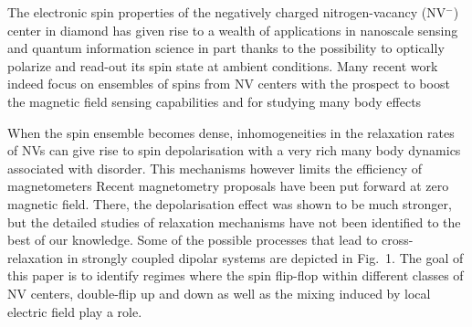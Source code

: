 \documentclass[preprintnumbers,amsmath,amssymb,superscriptaddress,twocolumn,showpacs]{revtex4-2}
\begin{document}
%

The electronic spin properties of the negatively charged nitrogen-vacancy (NV$^-$) center in diamond has given rise to a wealth of applications in nanoscale sensing and quantum information science in part thanks to the possibility to optically polarize and read-out its spin state at ambient conditions. Many recent work indeed focus on ensembles of spins from NV centers with the prospect to boost the magnetic field sensing capabilities and for studying many body effects
\citep{TALLAIRE2020421,edmonds2021characterisation, chatzidrosos2021fiberized, kucsko2018critical, giri_coupled_2018}

When the spin ensemble becomes dense, inhomogeneities in the relaxation rates of NVs can give rise to spin depolarisation with a very rich many body dynamics associated with disorder. This mechanisms however limits the efficiency of magnetometers \citep{zhou2020quantum}
Recent magnetometry proposals have been put forward at zero magnetic field. There, the depolarisation effect was shown to be much stronger, but the detailed studies of relaxation mechanisms have not been identified to the best of our knowledge. Some of the possible processes that lead to cross-relaxation in strongly coupled dipolar systems are depicted in Fig.~1. The goal of this paper is to identify regimes where the spin flip-flop within different classes of NV centers, double-flip up and down as well as the mixing induced by local electric field play a role. 
\end{document}

